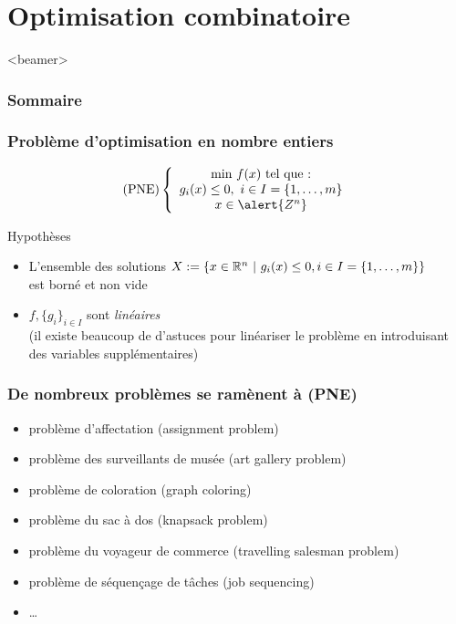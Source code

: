 \documentclass{beamer}
\newcommand{\R}{{\ensuremath\mathbb{R}}}
\begin{document}

\section{Optimisation combinatoire}

\begin{frame}<beamer>
  \frametitle{Sommaire}
  \tableofcontents[currentsection]
\end{frame}

\begin{frame}
  \frametitle{Problème d'optimisation en nombre entiers}
  
  \[
  \text{(PNE)} \left\{
  \begin{array}{c}
    \text{min} \ f(x) \ \text{tel que :} \\
    g_i(x) \leq 0, \ i \in I = \{1, \dots, m\} \\
    x \in \alert{Z^n}
  \end{array}
  \right.
  \]

  \begin{block}{Hypothèses}
    \begin{itemize}
    \item L'ensemble des solutions $X := \{ x \in \R^n \ | \ g_i(x) \leq 0, i \in I = \{1, \dots, m\} \}$ \\
      est borné et non vide
    \item $f, \{g_i\}_{i \in I}$ sont \emph{linéaires} \\
      (il existe beaucoup de d'astuces pour
      linéariser le problème en introduisant des variables supplémentaires)
    \end{itemize}
  \end{block}
\end{frame}

\begin{frame}
  \frametitle{De nombreux problèmes se ramènent à (PNE)}

  \begin{itemize}
    \item problème d'affectation (assignment problem)
    \item problème des surveillants de musée (art gallery problem)
    \item problème de coloration (graph coloring)
    \item problème du sac à dos (knapsack problem)
    \item problème du voyageur de commerce (travelling salesman problem)
    \item problème de séquençage de tâches (job sequencing)
    \item \dots
  \end{itemize}
  
\end{frame}
\end{document}
